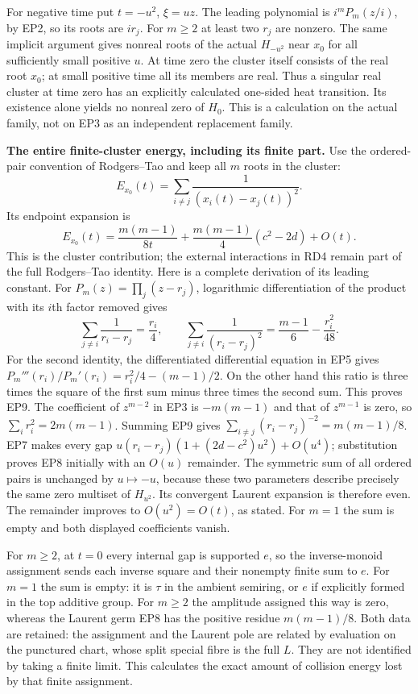 For negative time put $t=-u^2$, $\xi=uz$. The leading polynomial
is $i^mP_m(z/i)$, by EP2, so its roots are $ir_j$.
For $m\ge2$ at least two $r_j$ are nonzero. The same implicit
argument gives nonreal roots of the actual $H_{-u^2}$ near $x_0$
for all sufficiently small positive $u$.
At time zero the cluster itself consists of the real root $x_0$;
at small positive time all its members are real. Thus a singular
real cluster at time zero has an explicitly calculated one-sided
heat transition. Its existence alone yields no nonreal zero of
$H_0$. This is a calculation on the actual family, not on EP3 as
an independent replacement family.

\EP\textbf{The entire finite-cluster energy, including its finite part.}
Use the ordered-pair convention of Rodgers--Tao and keep all $m$
roots in the cluster:
\[
 E_{x_0}(t)=\sum_{i\ne j}\frac1{(x_i(t)-x_j(t))^2}.
\]
Its endpoint expansion is
\[
 \boxed{E_{x_0}(t)=\frac{m(m-1)}{8t}
       +\frac{m(m-1)}4(c^2-2d)+O(t).}
 \tag{EP8}\label{ep:energy}
\]
This is the cluster contribution; the external interactions in RD4
remain part of the full Rodgers--Tao identity.
Here is a complete derivation of its leading constant.
For $P_m(z)=\prod_j(z-r_j)$, logarithmic differentiation of the
product with its $i$th factor removed gives
\[
 \sum_{j\ne i}\frac1{r_i-r_j}=\frac{r_i}4,\qquad
 \sum_{j\ne i}\frac1{(r_i-r_j)^2}
            =\frac{m-1}6-\frac{r_i^2}{48}.
 \tag{EP9}
\]
For the second identity, the differentiated differential equation
in EP5 gives $P_m'''(r_i)/P_m'(r_i)=r_i^2/4-(m-1)/2$.
On the other hand this ratio is three times the square of the
first sum minus three times the second sum. This proves EP9.
The coefficient of $z^{m-2}$ in EP3 is $-m(m-1)$ and that of
$z^{m-1}$ is zero, so $\sum_i r_i^2=2m(m-1)$.
Summing EP9 gives $\sum_{i\ne j}(r_i-r_j)^{-2}=m(m-1)/8$.
EP7 makes every gap
$u(r_i-r_j)(1+(2d-c^2)u^2)+O(u^4)$; substitution proves EP8
initially with an $O(u)$ remainder. The symmetric sum of all
ordered pairs is unchanged by $u\mapsto-u$, because these two
parameters describe precisely the same zero multiset of $H_{u^2}$.
Its convergent Laurent expansion is therefore even. The remainder
improves to $O(u^2)=O(t)$, as stated.
For $m=1$ the sum is empty and both displayed coefficients vanish.

For $m\ge2$, at $t=0$ every internal gap is supported $e$, so the
inverse-monoid assignment sends each inverse square and their nonempty
finite sum to $e$. For $m=1$ the sum is empty: it is $\tau$ in the
ambient semiring, or $e$ if explicitly formed in the top additive group.
For $m\ge2$ the amplitude assigned this way is zero, whereas the
Laurent germ EP8 has the positive residue $m(m-1)/8$.
Both data are retained: the assignment and the Laurent pole are
related by evaluation on the punctured chart, whose split special
fibre is the full $L$. They are not identified by taking a finite
limit. This calculates the exact amount of collision energy lost
by that finite assignment.

